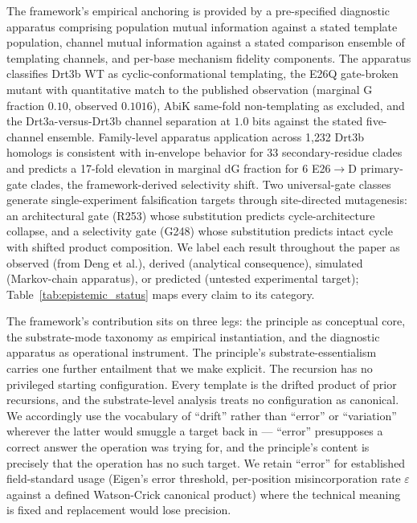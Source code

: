 \documentclass[aps,prx,reprint,amsmath,amssymb,floatfix,superscriptaddress,nofootinbib]{revtex4-2}
\theoremstyle{plain-thm}
\theoremstyle{definition-thm}
\begin{document}
The framework's empirical anchoring is provided by a pre-specified diagnostic apparatus comprising population mutual information against a stated template population, channel mutual information against a stated comparison ensemble of templating channels, and per-base mechanism fidelity components. The apparatus classifies Drt3b WT as cyclic-conformational templating, the E26Q gate-broken mutant with quantitative match to the published observation (marginal G fraction $0.10$, observed $0.1016$), AbiK same-fold non-templating as excluded, and the Drt3a-versus-Drt3b channel separation at $1.0$ bits against the stated five-channel ensemble. Family-level apparatus application across 1{,}232 Drt3b homologs is consistent with in-envelope behavior for 33 secondary-residue clades and predicts a 17-fold elevation in marginal dG fraction for 6 E26$\to$D primary-gate clades, the framework-derived selectivity shift. Two universal-gate classes generate single-experiment falsification targets through site-directed mutagenesis: an architectural gate (R253) whose substitution predicts cycle-architecture collapse, and a selectivity gate (G248) whose substitution predicts intact cycle with shifted product composition. We label each result throughout the paper as observed (from Deng et al.), derived (analytical consequence), simulated (Markov-chain apparatus), or predicted (untested experimental target); Table~\ref{tab:epistemic_status} maps every claim to its category.

The framework's contribution sits on three legs: the principle as conceptual core, the substrate-mode taxonomy as empirical instantiation, and the diagnostic apparatus as operational instrument. The principle's substrate-essentialism carries one further entailment that we make explicit. The recursion has no privileged starting configuration. Every template is the drifted product of prior recursions, and the substrate-level analysis treats no configuration as canonical. We accordingly use the vocabulary of ``drift'' rather than ``error'' or ``variation'' wherever the latter would smuggle a target back in --- ``error'' presupposes a correct answer the operation was trying for, and the principle's content is precisely that the operation has no such target. We retain ``error'' for established field-standard usage (Eigen's error threshold, per-position misincorporation rate $\varepsilon$ against a defined Watson-Crick canonical product) where the technical meaning is fixed and replacement would lose precision.
\end{document}

